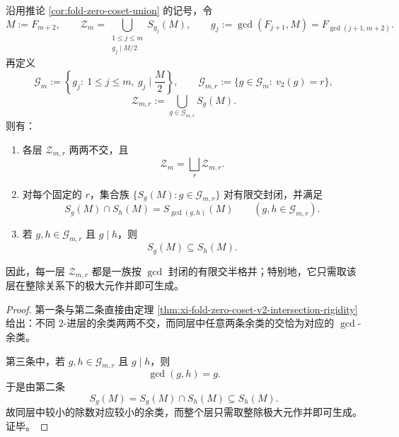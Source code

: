 \begin{corollary}\label{cor:xi-fold-zero-set-v2-semilattice-decomposition}
沿用推论 \ref{cor:fold-zero-coset-union} 的记号，令
\[
M:=F_{m+2},
\qquad
\mathcal Z_m
=
\bigcup_{\substack{1\le j\le m\\ g_j\mid M/2}}S_{g_j}(M),
\qquad
g_j:=\gcd(F_{j+1},M)=F_{\gcd(j+1,m+2)}.
\]
再定义
\[
\mathcal G_m:=\left\{g_j:\ 1\le j\le m,\ g_j\mid \frac{M}{2}\right\},
\qquad
\mathcal G_{m,r}:=\{g\in\mathcal G_m:\ v_2(g)=r\},
\]
\[
\mathcal Z_{m,r}:=\bigcup_{g\in\mathcal G_{m,r}}S_g(M).
\]
则有：
\begin{enumerate}
  \item 各层 \(\mathcal Z_{m,r}\) 两两不交，且
  \[
  \boxed{\;
  \mathcal Z_m=\bigsqcup_r \mathcal Z_{m,r}.\;}
  \]
  \item 对每个固定的 \(r\)，集合族 \(\{S_g(M): g\in \mathcal G_{m,r}\}\) 对有限交封闭，并满足
  \[
  \boxed{\;
  S_g(M)\cap S_h(M)=S_{\gcd(g,h)}(M)
  \qquad (g,h\in \mathcal G_{m,r}).\;}
  \]
  \item 若 \(g,h\in \mathcal G_{m,r}\) 且 \(g\mid h\)，则
  \[
  \boxed{\;
  S_g(M)\subseteq S_h(M).\;}
  \]
\end{enumerate}
因此，每一层 \(\mathcal Z_{m,r}\) 都是一族按 \(\gcd\) 封闭的有限交半格并；特别地，它只需取该层在整除关系下的极大元作并即可生成。
\end{corollary}
\begin{proof}
第一条与第二条直接由定理 \ref{thm:xi-fold-zero-coset-v2-intersection-rigidity} 给出：不同 \(2\)-进层的余类两两不交，而同层中任意两条余类的交恰为对应的 \(\gcd\)-余类。

第三条中，若 \(g,h\in\mathcal G_{m,r}\) 且 \(g\mid h\)，则
\[
\gcd(g,h)=g.
\]
于是由第二条
\[
S_g(M)
=
S_g(M)\cap S_h(M)
\subseteq
S_h(M).
\]
故同层中较小的除数对应较小的余类，而整个层只需取整除极大元作并即可生成。证毕。
\end{proof}

